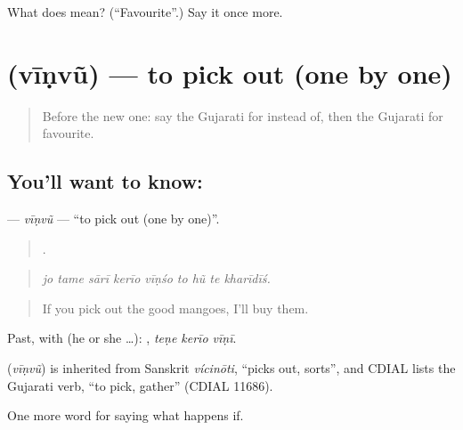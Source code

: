 \begin{tcolorbox}[breakable,colback=teal!4,colframe=teal!35!black,title={Before you move on}]
What does  mean? (\textquotedblleft{}Favourite\textquotedblright{}.) Say it once more.
\end{tcolorbox}
\section[\texorpdfstring{\gu{વીણવું} (vīṇvũ)}{વીણવું (vīṇvũ)}]{ (vīṇvũ) — to pick out (one by one)}

\label{lesson:GU-C537-vinvu}



\begin{quote}
Before the new one: say the Gujarati for instead of, then the Gujarati for favourite.
\end{quote}

\subsection*{You'll want to know: }
\textbf{} — \emph{vīṇvũ} — \textquotedblleft{}to pick out (one by one)\textquotedblright{}.

\begin{quote}
        .
\end{quote}

\begin{quote}
\emph{jo tame sārī kerīo vīṇśo to hũ te kharīdīś.}
\end{quote}

\begin{quote}
If you pick out the good mangoes, I'll buy them.
\end{quote}

Past, with  (he or she …):   , \emph{teṇe kerīo vīṇī}.

\begin{cousinweb}
\textbf{} (\emph{vīṇvũ}) is inherited from Sanskrit \emph{vícinōti}, \textquotedblleft{}picks out, sorts\textquotedblright{}, and CDIAL lists the Gujarati verb, \textquotedblleft{}to pick, gather\textquotedblright{} (CDIAL 11686).
\end{cousinweb}

\begin{grammarlens}[title={What you've built}]
One more word for saying what happens if.
\end{grammarlens}

